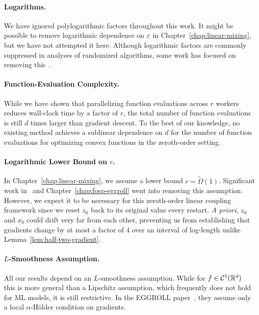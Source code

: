 \paragraph{Logarithms.}
We have ignored polylogarithmic factors throughout this work. It might be possible to remove logarithmic dependence on $\varepsilon$ in Chapter~\ref{chap:linear-mixing}, but we have not attempted it here. Although logarithmic factors are commonly suppressed in analyses of randomized algorithms, some work has focused on removing this~\citep{li2022last}.

\paragraph{Function-Evaluation Complexity.}
While we have shown that parallelizing function evaluations across $r$ workers reduces wall-clock time by a factor of $r$, the total number of function evaluations is still $d$ times larger than gradient descent. To the best of our knowledge, no existing method achieves a sublinear dependence on $d$ for the number of function evaluations for optimizing convex functions in the zeroth-order setting.

\paragraph{Logarithmic Lower Bound on $r$.} In Chapter~\ref{chap:linear-mixing}, we assume a lower bound $r=\widetilde{\Omega}(1)$. Significant work in~\citet{ren2023escaping} and Chapter~\ref{chap:fosp-eggroll} went into removing this assumption. However, we expect it to be necessary for this zeroth-order linear coupling framework since we reset $z_0$ back to its original value every restart. \textit{A priori}, $z_0$ and $x_0$ could drift very far from each other, preventing us from establishing that gradients change by at most a factor of 4 over an interval of log-length unlike Lemma~\ref{lem:half-two-gradient}.

\paragraph{$L$-Smoothness Assumption.} All our results depend on an $L$-smoothness assumption. While for $f \in \mathcal C^1(\mathbb{R}^d)$ this is more general than a Lipschitz assumption, which frequently does not hold for ML models, it is still restrictive. In the EGGROLL paper~\citep{sarkar2025evolution}, they assume only a local $\alpha$-H\"older condition on gradients. 

